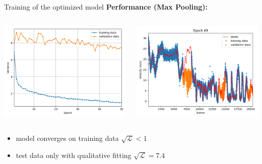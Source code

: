 \begin{frame}{Training of the optimized model}
	\textbf{Performance (Max Pooling):}
	\begin{columns}[c]
		\begin{column}{0.5\textwidth}
			\includegraphics[width=\textwidth]{imgs/normal_performance.png}
		\end{column}
		\begin{column}{0.5\textwidth}
			\includegraphics[width=\textwidth]{imgs/normal_training.png}
		\end{column}
	\end{columns}
	\begin{itemize}
		\item model converges on training data $\sqrt{\mathcal{L}} < 1$
		\item test data only with qualitative fitting $\sqrt{\mathcal{L}} = 7.4$
	\end{itemize}
\end{frame}

